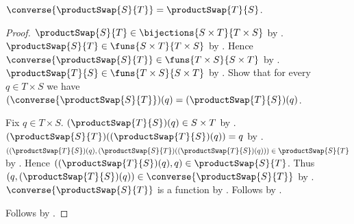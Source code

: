 \begin{theorem}\label{product_swap_converse}
    $\converse{\productSwap{S}{T}}=\productSwap{T}{S}$.
\end{theorem}
\begin{proof}
    $\productSwap{S}{T}\in\bijections{S\times T}{T\times S}$ by
        .
    $\productSwap{S}{T}\in\funs{S\times T}{T\times S}$ by
        .
    Hence $\converse{\productSwap{S}{T}}
        \in\funs{T\times S}{S\times T}$ by
        .
    $\productSwap{T}{S}\in\funs{T\times S}{S\times T}$ by
        .
    Show that for every $q\in T\times S$ we have
        $(\converse{\productSwap{S}{T}})(q)
        =(\productSwap{T}{S})(q)$.
    \begin{subproof}
        Fix $q\in T\times S$.
        $(\productSwap{T}{S})(q)\in S\times T$ by
            .
        $(\productSwap{S}{T})((\productSwap{T}{S})(q))=q$ by
            .
        $((\productSwap{T}{S})(q),
            (\productSwap{S}{T})((\productSwap{T}{S})(q)))
            \in\productSwap{S}{T}$ by
            .
        Hence $((\productSwap{T}{S})(q),q)
            \in\productSwap{S}{T}$.
        Thus $(q,(\productSwap{T}{S})(q))
            \in\converse{\productSwap{S}{T}}$ by
            .
        $\converse{\productSwap{S}{T}}$ is a function by
            .
        Follows by .
    \end{subproof}
    Follows by .
\end{proof}

